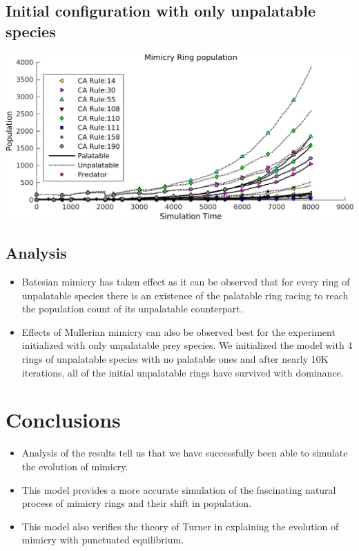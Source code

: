 \documentclass[a0,landscape]{a0poster}
\begin{document}
\begin{multicols}{5}
\subsection*{Initial configuration with only unpalatable species}

\begin{center}\vspace{1cm}
\includegraphics[width=0.8\linewidth]{simTime8k-4Prey-unp.png}
\end{center}\vspace{1cm}

\color{SaddleBrown} 
\subsection*{Analysis}
\begin{itemize}
\item Batesian mimicry has taken effect as it can be observed that for every ring of unpalatable species there is an existence of the palatable ring racing to reach the population count of its unpalatable counterpart.
\item Effects of Mullerian mimicry can also be observed best for the experiment initialized with only unpalatable prey species. We initialized the model with 4 rings of unpalatable species with no palatable ones and after nearly 10K iterations, all of the initial unpalatable rings have survived with dominance. 
\end{itemize}
\color{DarkSlateGray}
\section*{Conclusions}
\begin{itemize}
\item Analysis of the results tell us that we have successfully been able to simulate the evolution of mimicry.
\item This model provides a more accurate simulation of the fascinating natural process of mimicry rings and their shift in population. 
\item This model also verifies the theory of Turner in explaining the evolution of mimicry with punctuated equilibrium.
\end{itemize}


\end{multicols}
\end{document}
